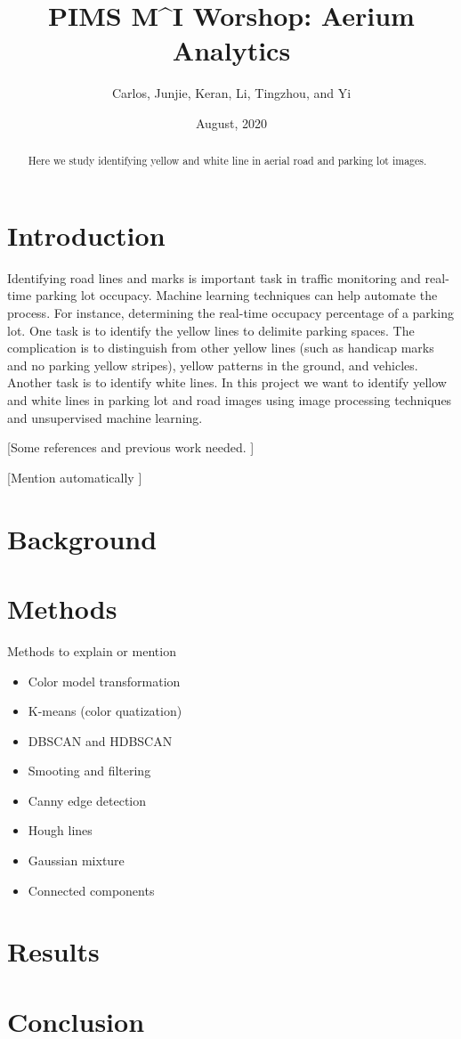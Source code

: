 \documentclass{article}
\author{Carlos, Junjie, Keran, Li, Tingzhou, and Yi}
\title{PIMS M\textasciicircum I Worshop: Aerium Analytics}
\date{August, 2020}
\begin{document}
\maketitle



\begin{abstract}
Here we study identifying yellow and white line in aerial road and parking lot images.
\end{abstract}



\section{Introduction}
Identifying road lines and marks is important task in traffic monitoring and real-time parking lot occupacy. Machine learning techniques can help automate the process. For instance, determining the real-time occupacy percentage of a parking lot. One task is to identify the yellow lines to delimite parking spaces. The complication is to distinguish from other yellow lines (such as handicap marks and no parking yellow stripes), yellow patterns in the ground, and vehicles. Another task is to identify white lines. In this project we want to identify yellow and white lines in parking lot and road images using image processing techniques and unsupervised machine learning.

[Some references and previous work needed. \citep{Lin2014}]

[Mention automatically ]


\section{Background}



\section{Methods}


Methods to explain or mention

\begin{itemize}
    \item Color model transformation
    \item K-means (color quatization)
    \item DBSCAN and HDBSCAN
    \item Smooting and filtering
    \item Canny edge detection
    \item Hough lines
    \item Gaussian mixture
    \item Connected components
\end{itemize}

\section{Results}


\section{Conclusion}




\end{document}
